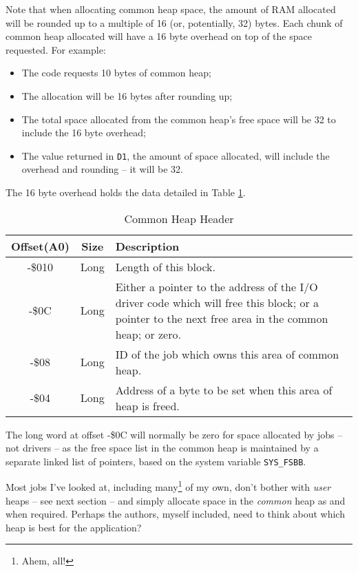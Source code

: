 Note that when allocating common heap space, the amount of RAM allocated
will be rounded up to a multiple of 16 (or, potentially, 32) bytes.
Each chunk of common heap allocated will have a 16 byte overhead on
top of the space requested. For example:
\begin{itemize}
\item The code requests 10 bytes of common heap;
\item The allocation will be 16 bytes after rounding up;
\item The total space allocated from the common heap's free space will be
32 to include the 16 byte overhead;
\item The value returned in \texttt{D1}, the amount of space allocated,
will include the overhead and rounding -- it will be 32.
\end{itemize}
The 16 byte overhead holds the data detailed in Table \ref{tab:Common-Heap-Header}.

\begin{table}[!h]
\begin{centering}
\begin{tabular}{|c|c|>{\raggedright}p{}|}
\hline 
\textbf{Offset(A0)} & \textbf{Size} & \textbf{Description}\tabularnewline
\hline 
\hline 
-\$010 & Long & Length of this block.\tabularnewline
\hline 
-\$0C & Long & Either a pointer to the address of the I/O driver code which will
free this block; or a pointer to the next free area in the common
heap; or zero.\tabularnewline
\hline 
-\$08 & Long & ID of the job which owns this area of common heap.\tabularnewline
\hline 
-\$04 & Long & Address of a byte to be set when this area of heap is freed.\tabularnewline
\hline 
\end{tabular}
\par\end{centering}
\caption{Common Heap Header\label{tab:Common-Heap-Header}}
\end{table}

The long word at offset -\$0C will normally be zero for space allocated
by jobs -- not drivers -- as the free space list in the common heap
is maintained by a separate linked list of pointers, based on the
system variable \texttt{SYS\_FSBB}.

Most jobs I've looked at, including many\footnote{Ahem, all!} of
my own, don't bother with \emph{user} heaps -- see next section --
and simply allocate space in the \emph{common} heap as and when required.
Perhaps the authors, myself included, need to think about which heap
is best for the application?

